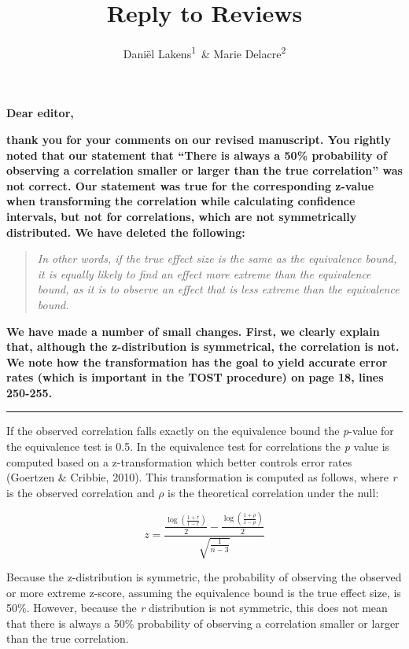 \documentclass[man]{apa6}
\title{Reply to Reviews}
\author{Daniël Lakens\textsuperscript{1}~\& Marie Delacre\textsuperscript{2}}
\date{}
\affiliation{
\vspace{0.5cm}
\textsuperscript{1} Eindhoven University of Technology, Eindhoven, The Netherlands\\\textsuperscript{2} Service of Analysis of the Data, Université Libre de Bruxelles, Belgium}
\begin{document}
\maketitle

\textbf{Dear editor,}

\textbf{thank you for your comments on our revised manuscript. You rightly noted that our statement that \enquote{There is always a 50\% probability of observing a correlation smaller or larger than the true correlation} was not correct. Our statement was true for the corresponding z-value when transforming the correlation while calculating confidence intervals, but not for correlations, which are not symmetrically distributed. We have deleted the following:}

\begin{quote}
\emph{In other words, if the true effect size is the same as the equivalence bound, it is equally likely to find an effect more extreme than the equivalence bound, as it is to observe an effect that is less extreme than the equivalence bound.}
\end{quote}

\textbf{We have made a number of small changes. First, we clearly explain that, although the z-distribution is symmetrical, the correlation is not. We note how the transformation has the goal to yield accurate error rates (which is important in the TOST procedure) on page 18, lines 250-255.}

\begin{center}\rule{0.5\linewidth}{\linethickness}\end{center}

If the observed correlation falls exactly on the equivalence bound the \emph{p}-value for the equivalence test is 0.5. In the equivalence test for correlations the \emph{p} value is computed based on a z-transformation which better controls error rates (Goertzen \& Cribbie, 2010). This transformation is computed as follows, where \emph{r} is the observed correlation and \(\rho\) is the theoretical correlation under the null:

\[
z = \frac{\frac{\log(\frac{1 + r}{ 1 - r})}{2} - \frac{\log(\frac{1 + \rho}{ 1 - \rho})}{2}}{\sqrt{\frac{1}{n-3}}}
\]

Because the z-distribution is symmetric, the probability of observing the observed or more extreme z-score, assuming the equivalence bound is the true effect size, is 50\%. However, because the \emph{r} distribution is not symmetric, this does not mean that there is always a 50\% probability of observing a correlation smaller or larger than the true correlation.
\end{document}
